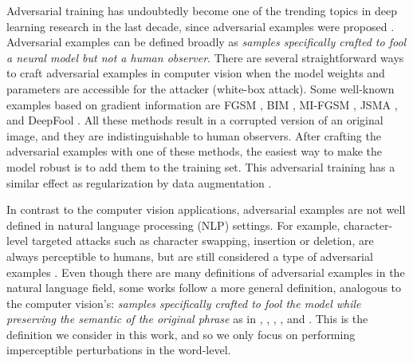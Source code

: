\documentclass[letterpaper]{article} %
\begin{document}
Adversarial training has undoubtedly become one of the trending topics in deep learning research in the last decade, since adversarial examples were proposed \cite{szegedy2013intriguing, goodfellow2014explaining}. Adversarial examples can be defined broadly as \textit{samples specifically crafted to fool a neural model but not a human observer}. There are several straightforward ways to craft adversarial examples in computer vision when the model weights and parameters are accessible for the attacker (white-box attack). Some well-known examples based on gradient information are FGSM \cite{goodfellow2014explaining}, BIM \cite{kurakin2016adversarial}, MI-FGSM \cite{dong2018boosting}, JSMA \cite{papernot2016limitations}, and DeepFool  \cite{moosavi2016deepfool}. All these methods result in a corrupted version of an original image, and they are indistinguishable to human observers. After crafting the adversarial examples with one of these methods, the easiest way to make the model robust is to add them to the training set. This adversarial training has a similar effect as regularization by data augmentation \cite{goodfellow2014explaining}.


In contrast to the computer vision applications, adversarial examples are not well defined in natural language processing (NLP) settings. For example, character-level targeted attacks such as character swapping, insertion or deletion, are always perceptible to humans, but are still considered a type of adversarial examples \cite{ebrahimi2018adversarial}. Even though there are many definitions of adversarial examples in the natural language field, some works follow a more general definition, analogous to the computer vision's: \textit{samples specifically crafted to fool the model while preserving the semantic of the original phrase} as in \citeauthor{alzantot2018generating} \citeyear{alzantot2018generating}, \citeauthor{jin2020bert} \citeyear{jin2020bert}, \citeauthor{ren2019generating} \citeyear{ren2019generating}, \citeauthor{morris2020second} \citeyear{morris2020second}, and \citeauthor{garg2020bae} \citeyear{garg2020bae}. This is the definition we consider in this work, and so we only focus on performing imperceptible perturbations in the word-level.
\end{document}
